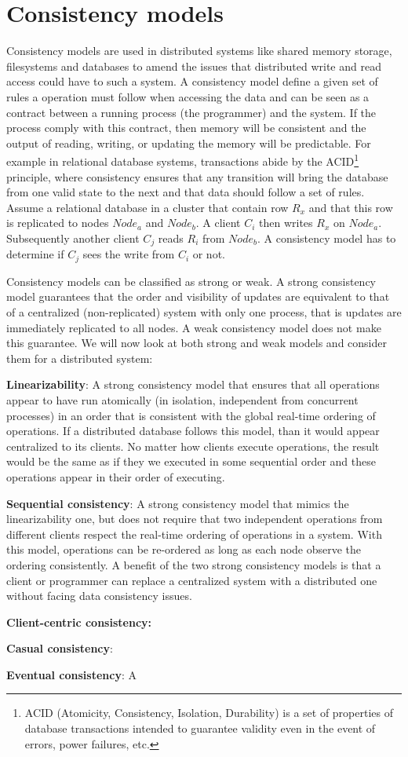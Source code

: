 \section{Consistency models}

Consistency models are used in distributed systems like shared memory storage, filesystems and databases to amend the issues that distributed write and read access could have to such a system. A consistency model define a given set of rules a operation must follow when accessing the data and can be seen as a contract between a running process (the programmer) and the system. If the process comply with this contract, then memory will be consistent and the output of reading, writing, or updating the memory will be predictable. For example in relational database systems, transactions abide by the ACID\footnote{ACID (Atomicity, Consistency, Isolation, Durability) is a set of properties of database transactions intended to guarantee validity even in the event of errors, power failures, etc.} principle, where consistency ensures that any transition will bring the database from one valid state to the next and that data should follow a set of rules. Assume a relational database in a cluster that contain row $R_x$ and that this row is replicated to nodes $Node_a$ and $Node_b$. A client $C_i$ then writes $R_x$ on $Node_a$. Subsequently another client $C_j$ reads $R_i$ from $Node_b$. A consistency model has to determine if $C_j$ sees the write from $C_i$ or not.

Consistency models can be classified as strong or weak. A strong consistency model guarantees that the order and visibility of updates are equivalent to that of a centralized (non-replicated) system with only one process, that is updates are immediately replicated to all nodes. A weak consistency model does not make this guarantee. We will now look at both strong and weak models and consider them for a distributed system:

\textbf{Linearizability}: A strong consistency model that ensures that all operations appear to have run atomically (in isolation, independent from concurrent processes) in an order that is consistent with the global real-time ordering of operations. If a distributed database follows this model, than it would appear centralized to its clients. No matter how clients execute operations, the result would be the same as if they we executed in some sequential order and these operations appear in their order of executing.

\textbf{Sequential consistency}: A strong consistency model that mimics the linearizability one, but does not require that two independent operations from different clients respect the real-time ordering of operations in a system. With this model, operations can be re-ordered as long as each node observe the ordering consistently. A benefit of the two strong consistency models is that a client or programmer can replace a centralized system with a distributed one without facing data consistency issues.

\textbf{Client-centric consistency:} 

\textbf{Casual consistency}: 

\textbf{Eventual consistency}: A 